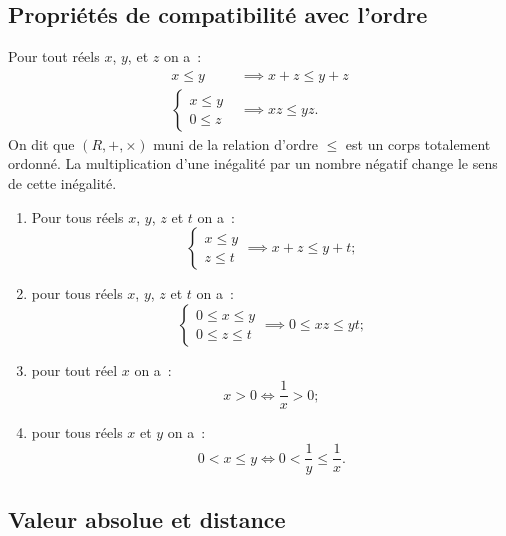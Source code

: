 \subsection{Propriétés de compatibilité avec l'ordre}

\begin{prop}
  Pour tout réels $x$, $y$, et $z$ on a~:
  \begin{align}
    x\leqslant y &\implies x+z\leqslant y+z \\
    \begin{cases} x\leqslant y \\ 0\leqslant z \end{cases} &\implies xz \leqslant yz.
  \end{align}
On dit que $(R,+,\times)$ muni de la relation d'ordre $\leqslant$ est un corps totalement ordonné. La multiplication d'une inégalité par un nombre négatif change le sens de cette inégalité.
\end{prop}
\begin{enumerate}
\item Pour tous réels $x$, $y$, $z$ et $t$ on a~:
  \begin{equation}
    \begin{cases}x\leqslant y \\ z \leqslant t \end{cases} \implies x+z\leqslant y+t;
  \end{equation}
\item pour tous réels $x$, $y$, $z$ et $t$ on a~:
  \begin{equation}
    \begin{cases}0\leqslant x\leqslant y \\ 0 \leqslant z \leqslant t \end{cases} \implies 0\leqslant xz \leqslant yt;
  \end{equation}
\item pour tout réel $x$ on a~:
  \begin{equation}
    x>0 \iff \frac{1}{x}>0;
  \end{equation}
\item pour tous réels $x$ et $y$ on a~:
  \begin{equation}
    0<x\leqslant y \iff 0<\frac{1}{y}\leqslant \frac{1}{x}.
  \end{equation}
\end{enumerate}

\subsection{Valeur absolue et distance}

